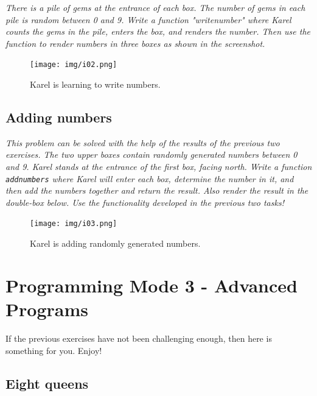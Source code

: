 {\em There is a pile of gems at the entrance of each box. The number of gems in each pile is random between 0 and 9. Write a function "writenumber" where Karel counts the gems in the pile, enters the box, and renders the number. Then use the function to render numbers in three boxes as shown in the screenshot. }


\begin{figure}[!ht]
\begin{center}
\texttt{[image: img/i02.png]}
\end{center}
\vspace{-4mm}
\caption{Karel is learning to write numbers.}
\label{fig:g11}
\vspace{-10mm}
\end{figure}


\newpage

\subsection{Adding numbers}

\noindent
{\em This problem can be solved with the help of the results 
of the previous two exercises.
The two upper boxes contain randomly generated numbers between 0 and 9. Karel stands at the entrance of the first box,
facing north. Write a function {\tt addnumbers} where Karel will enter each box, determine the number in it,
and then add the numbers together and return the result. Also render the result in the double-box below. 
Use the functionality developed in the previous two tasks!}

\begin{figure}[!ht]
\begin{center}
\texttt{[image: img/i03.png]}
\end{center}
\vspace{-4mm}
\caption{Karel is adding randomly generated numbers.}
\label{fig:g12}
\end{figure}

\newpage

\section{Programming Mode 3 - Advanced Programs}

If the previous exercises have not been challenging enough, then here is something 
for you. Enjoy!

\subsection{Eight queens}


